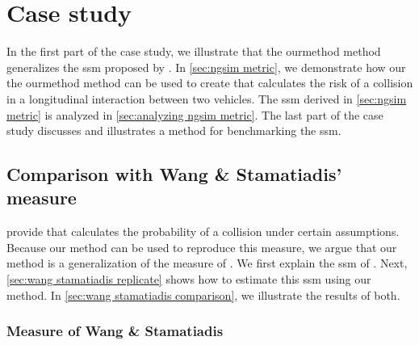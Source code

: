 \section{Case study}
\label{sec:case study}

In the first part of the case study, we illustrate that the \ac{ourmethod} method generalizes the \ac{ssm} proposed by \textcite{wang2014evaluation}.
In \cref{sec:ngsim metric}, we demonstrate how our the \ac{ourmethod} method can be used to create  that calculates the risk of a collision in a longitudinal interaction between two vehicles.
The \ac{ssm} derived in \cref{sec:ngsim metric} is analyzed in \cref{sec:analyzing ngsim metric}.
The last part of the case study discusses and illustrates a method for benchmarking the \ac{ssm}.



\subsection{Comparison with Wang \& Stamatiadis' measure}
\label{sec:wang stamatiadis}

\textcite{wang2014evaluation} provide  that calculates the probability of a collision under certain assumptions. 
Because our method can be used to reproduce this measure, we argue that our method is a generalization of the measure of \textcite{wang2014evaluation}.
We first explain the \ac{ssm} of \textcite{wang2014evaluation}. 
Next, \cref{sec:wang stamatiadis replicate} shows how to estimate this \ac{ssm} using our method.
In \cref{sec:wang stamatiadis comparison}, we illustrate the results of both.



\subsubsection{Measure of Wang \& Stamatiadis}
\label{sec:wang stamatiadis explanation}

